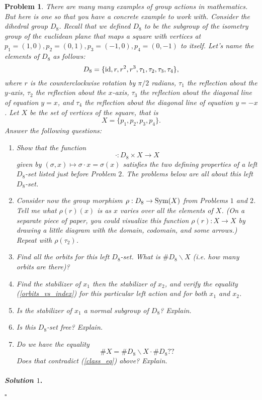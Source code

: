 \documentclass[reqno]{amsart}
\theoremstyle{plain}
\newtheorem{problem}{Problem}
\theoremstyle{definition}
\newenvironment{solution1}{\paragraph{\emph{Solution $1$}.}}{\hfill$\square$}
\begin{document}
\begin{problem}
There are many many examples of group actions in mathematics.  But here is one so that you have a concrete example to work with.  Consider the dihedral group $D_{8}$.  Recall that we defined $D_{8}$ to be the subgroup of the isometry group of the euclidean plane that maps a square with vertices at $p_{1} = (1,0), p_{2} = (0,1), p_{3} = (-1,0), p_{4} = (0,-1)$ to itself.  Let's name the elements of $D_{8}$ as follows:
$$D_{8} = \{{\rm id}, r, r^{2}, r^{3}, \tau_{1}, \tau_{2}, \tau_{3}, \tau_{4} \}, $$
where $r$ is the counterclockwise rotation by $\pi/2$ radians, $\tau_{1}$ the reflection about the $y$-axis, $\tau_{2}$ the reflection about the $x$-axis, $\tau_{3}$ the reflection about the diagonal line of equation $y=x$, and $\tau_{4}$ the reflection about the diagonal line of equation $y = -x$.  Let $X$ be the set of vertices of the square, that is
$$X = \{p_{1},p_{2},p_{3},p_{4} \}. $$
Answer the following questions:
\begin{enumerate}[label=(\alph*)]
\item Show that the function 
$$\cdot: D_{8} \times X \rightarrow X$$ 
given by $(\sigma,x) \mapsto \sigma \cdot x = \sigma(x)$ satisfies the two defining properties of a left $D_{8}$-set listed just before Problem $2$.  The problems below are all about this left $D_{8}$-set.
\item Consider now the group morphism $\rho: D_{8} \rightarrow {\rm Sym}(X)$ from Problems $1$ and $2$.  Tell me what $\rho(r)(x)$ is as $x$ varies over all the elements of $X$.  (On a separate piece of paper, you could visualize this function $\rho(r):X \rightarrow X$ by drawing a little diagram with the domain, codomain, and some arrows.)  Repeat with $\rho(\tau_{2})$.
\item Find all the orbits for this left $D_{8}$-set.  What is $\# D_{8} \backslash X$ (i.e. how many orbits are there)?
\item Find the stabilizer of $x_{1}$ then the stabilizer of $x_{2}$, and verify the equality (\ref{orbits_vs_index}) for this particular left action and for both $x_{1}$ and $x_{2}$.
\item Is the stabilizer of $x_{1}$ a normal subgroup of $D_{8}$?  Explain.
\item Is this $D_{8}$-set free?  Explain.
\item Do we have the equality
$$\# X = \# D_{8} \backslash X \cdot \# D_{8}?? $$
Does that contradict (\ref{class_eq}) above?  Explain.
\end{enumerate}
\end{problem}
\begin{solution1}

\end{solution1}
\end{document}
